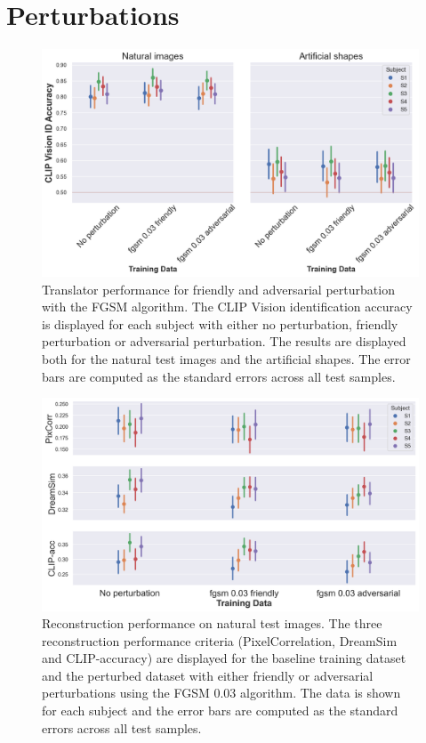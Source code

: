 \section{Perturbations}
\begin{figure}[H]
    \centering
    \includegraphics[width=1\textwidth]{plots/advpert_translator_fgsm_0.03.png}
    \caption[Experiment 3: Translator performance with FGSM]{Translator performance for friendly and adversarial perturbation with the FGSM algorithm. The CLIP Vision identification accuracy is displayed for each subject with either no perturbation, friendly perturbation or adversarial perturbation. The results are displayed both for the natural test images and the artificial shapes. The error bars are computed as the standard errors across all test samples.}\label{fig:advpert_translator_fgsm_0}
\end{figure}

\begin{figure}[H]
    \centering
    \includegraphics[width=1\textwidth]{plots/advpert_reconstruction_test_fgsm_0.03.png}
    \caption[Experiment 3: Reconstruction performance on natural test images with FGSM]{Reconstruction performance on natural test images. The three reconstruction performance criteria (PixelCorrelation, DreamSim and CLIP-accuracy) are displayed for the baseline training dataset and the perturbed dataset with either friendly or adversarial perturbations using the FGSM 0.03 algorithm. The data is shown for each subject and the error bars are computed as the standard errors across all test samples.}\label{fig:advpert_reconstruction_test_fgsm_0.03}
\end{figure}

